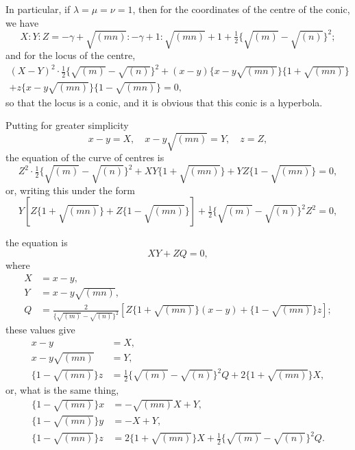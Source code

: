 \documentclass[11pt,a4paper]{article}
\theoremstyle{plain}
\begin{document}
\newpage
\setcounter{equation}{17}

In particular, if $\lambda = \mu = \nu = 1$, then for the coordinates of the centre of the conic, we have
\begin{equation}
X : Y : Z = -\gamma + \sqrt{(mn)} : -\gamma + 1 : \sqrt{(mn)} + 1 + \tfrac{1}{2}\{\sqrt{(m)} - \sqrt{(n)}\}^2;
\end{equation}
and for the locus of the centre,
\begin{multline}
(X-Y)^2 \cdot \tfrac{1}{2}\{\sqrt{(m)} - \sqrt{(n)}\}^2 + (x-y)\{x-y\sqrt{(mn)}\}\{1 + \sqrt{(mn)}\} \\
+ z\{x-y\sqrt{(mn)}\}\{1 - \sqrt{(mn)}\} = 0,
\end{multline}
so that the locus is a conic, and it is obvious that this conic is a hyperbola.

Putting for greater simplicity
\begin{equation}
x - y = X, \quad x - y\sqrt{(mn)} = Y, \quad z = Z,
\end{equation}
the equation of the curve of centres is
\begin{equation}
Z^2 \cdot \tfrac{1}{2}\{\sqrt{(m)} - \sqrt{(n)}\}^2 + XY\{1 + \sqrt{(mn)}\} + YZ\{1 - \sqrt{(mn)}\} = 0,
\end{equation}
or, writing this under the form
\begin{equation}
Y[Z\{1 + \sqrt{(mn)}\} + Z\{1 - \sqrt{(mn)}\}] + \tfrac{1}{2}\{\sqrt{(m)} - \sqrt{(n)}\}^2 Z^2 = 0,
\end{equation}

\newpage
\setcounter{equation}{21}

the equation is
\begin{equation}
XY + ZQ = 0,
\end{equation}
where
\begin{align}
X &= x-y, \\
Y &= x - y\sqrt{(mn)}, \\
Q &= \frac{2}{\{\sqrt{(m)} - \sqrt{(n)}\}^2}[Z\{1 + \sqrt{(mn)}\}(x - y) + \{1 - \sqrt{(mn)}\}z];
\end{align}
these values give
\begin{align}
x - y &= X, \\
x - y\sqrt{(mn)} &= Y, \\
\{1 - \sqrt{(mn)}\}z &= \tfrac{1}{2}\{\sqrt{(m)} - \sqrt{(n)}\}^2 Q + 2\{1 + \sqrt{(mn)}\}X,
\end{align}
or, what is the same thing,
\begin{align}
\{1 - \sqrt{(mn)}\}x &= -\sqrt{(mn)}X + Y, \\
\{1 - \sqrt{(mn)}\}y &= -X + Y, \\
\{1 - \sqrt{(mn)}\}z &= 2\{1 + \sqrt{(mn)}\}X + \tfrac{1}{2}\{\sqrt{(m)} - \sqrt{(n)}\}^2 Q.
\end{align}
\end{document}

